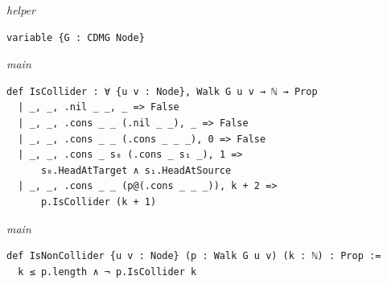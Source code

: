 {\small\textit{helper}}
\begin{verbatim}
variable {G : CDMG Node}
\end{verbatim}
{\small\textit{main}}
\begin{verbatim}
def IsCollider : ∀ {u v : Node}, Walk G u v → ℕ → Prop
  | _, _, .nil _ _, _ => False
  | _, _, .cons _ _ (.nil _ _), _ => False
  | _, _, .cons _ _ (.cons _ _ _), 0 => False
  | _, _, .cons _ s₀ (.cons _ s₁ _), 1 =>
      s₀.HeadAtTarget ∧ s₁.HeadAtSource
  | _, _, .cons _ _ (p@(.cons _ _ _)), k + 2 =>
      p.IsCollider (k + 1)
\end{verbatim}
{\small\textit{main}}
\begin{verbatim}
def IsNonCollider {u v : Node} (p : Walk G u v) (k : ℕ) : Prop :=
  k ≤ p.length ∧ ¬ p.IsCollider k
\end{verbatim}
~%

\vspace{\appendixNotesGap}

